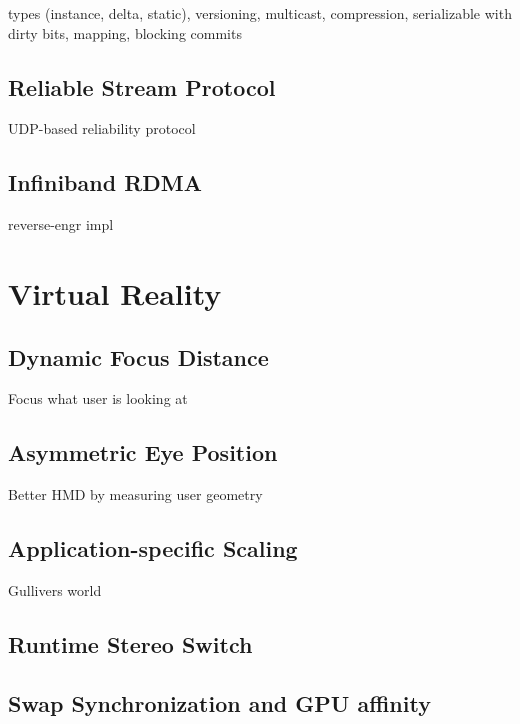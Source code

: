 \documentclass[journal]{vgtc}                %
\begin{document}
types (instance, delta, static), versioning, multicast, compression,
serializable with dirty bits, mapping, blocking commits

\subsection{Reliable Stream Protocol}

UDP-based reliability protocol

\subsection{Infiniband RDMA}

reverse-engr impl

\section{Virtual Reality}

\subsection{Dynamic Focus Distance}

Focus what user is looking at

\subsection{Asymmetric Eye Position}

Better HMD by measuring user geometry

\subsection{Application-specific Scaling}

Gullivers world

\subsection{Runtime Stereo Switch}

\subsection{Swap Synchronization and GPU affinity}

\end{document}
